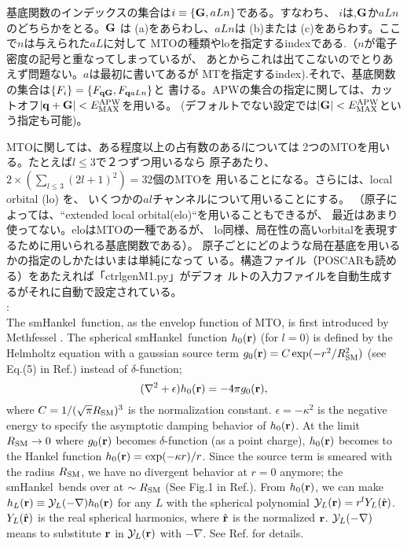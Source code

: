 \documentclass[twocolumn,showpacs,preprintnumbers,amsmath,amssymb,floatfix]{revtex4-1}
\newcommand{\bfq}{{\bf q}}
\newcommand{\bfr}{{\bf r}}
\newcommand{\bfG}{{\bf G}}
\newcommand{\YY}{{\cal Y}}
\def\smh{smHankel}
\def\EMAX{  E^{\rm APW}_{\rm MAX} }
\def\RSM{R_{\rm SM}}
\def\EMAX{  E^{\rm APW}_{\rm MAX} }
\begin{document}
基底関数のインデックスの集合は$i\equiv\{\bfG,aLn\}$である。すなわち、
$i$は,$\bfG$か$aLn$のどちらかをとる。$\bfG$ は (a)をあらわし、$aLn$は (b)または
(c)をあらわす。ここで$n$は与えられた$aL$に対して
MTOの種類やloを指定するindexである.（$n$が電子密度の記号と重なってしまっているが、
あとからこれは出てこないのでとりあえず問題ない。$a$は最初に書いてあるが
MTを指定するindex).それで、基底関数の集合は$\{F_i\}=\{F_{\bfq \bfG},F_{\bfq aLn}\}$と
書ける。APWの集合の指定に関しては、カットオフ$|\bfq+\bfG|<\EMAX$を用いる。
(デフォルトでない設定では$|\bfG|<\EMAX$という指定も可能)。

MTOに関しては、ある程度以上の占有数のある$l$については
2つのMTOを用いる。たとえば$l \le 3$で２つずつ用いるなら
原子あたり、$2\times\left(\sum_{l\leq 3}(2l+1)^2\right)=32$個のMTOを
用いることになる。さらには、local orbital (lo) \cite{lo} を、
いくつかの$al$チャンネルについて用いることにする。 
（原子によっては、``extended local orbital(elo)``を用いることもできるが、
最近はあまり使ってない。eloはMTOの一種であるが、
lo同様、局在性の高いorbitalを表現するために用いられる基底関数である）。
原子ごとにどのような局在基底を用いるかの指定のしかたはいまは単純になって
いる。構造ファイル（POSCARも読める）をあたえれば「ctrlgenM1.py」がデフォ
ルトの入力ファイルを自動生成するがそれに自動で設定されている。\\

\noindent{\bf smooth Hankel function(\smh)}:\\
The \smh\ function, as the envelop function of MTO, is first introduced
by Methfessel \cite{lmfchap,Bott98}. The spherical \smh\ function
$h_0(\bfr)$ (for $l=0$) is defined by the Helmholtz equation with a
gaussian source term $g_0(\bfr) = C \exp(-r^2/\RSM^2)$ (see Eq.(5) in
Ref.\cite{lmfchap}) instead of $\delta$-function;
\begin{equation}
(\nabla^2+\epsilon)h_0(\bfr) = -4 \pi g_0(\bfr),
\label{eq:defh0}
\end{equation}
where $C=1/(\sqrt{\pi} \RSM)^3$ is the normalization constant.
$\epsilon=-\kappa^2$ is the negative energy to specify the asymptotic
damping behavior of $h_0(\bfr)$.  At the limit $\RSM \to 0$ where
$g_0(\bfr)$ becomes $\delta$-function (as a point charge), $h_0(\bfr)$
becomes to the Hankel function $h_0(\bfr)=\exp(-\kappa r)/r$.  Since the
source term is smeared with the radius $\RSM$, we have no divergent
behavior at $r=0$ anymore; the \smh\ bends over at $\sim\RSM$ (See Fig.1
in Ref.\cite{lmfchap}).  From $h_0(\bfr)$, we can make
$h_L(\bfr)\equiv\YY_L(-\nabla) h_0(\bfr)$ for any $L$ with the spherical
polynomial $\YY_L(\bfr)=r^l Y_L(\hat{\bfr})$.  $Y_L(\hat{\bfr})$ is the
real spherical harmonics, where $\hat{\bfr}$ is the normalized
$\bfr$. $\YY_L(-\nabla)$ means to substitute $\bfr$ in $\YY_L(\bfr)$
with $-\nabla$. See Ref.\cite{Bott98} for details.\\
\end{document}
